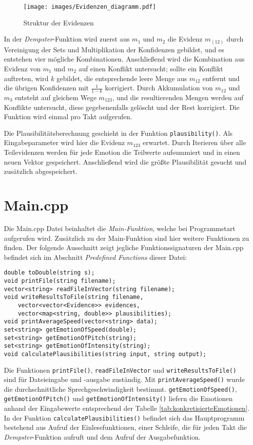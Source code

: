 \begin{figure}
\centering
\texttt{[image: images/Evidenzen\_diagramm.pdf]}
\caption{Struktur der Evidenzen}
\label{diagramm_evidenzen}
\end{figure}

In der \textit{Dempster}-Funktion wird zuerst aus \(m_1\) und \(m_2\) die Evidenz \(m_(12)\) durch Vereinigung der Sets und Multiplikation der Konfidenzen gebildet, und es entstehen vier mögliche Kombinationen. Anschließend wird die Kombination aus Evidenz von \(m_1\) und \(m_2\) auf einen Konflikt untersucht; sollte ein Konflikt auftreten, wird \(k\) gebildet, die entsprechende leere Menge aus \(m_{12}\) entfernt und die übrigen Konfidenzen mit \(\frac{1}{1-k}\) korrigiert. Durch Akkumulation von \(m_{12}\) und \(m_3\) entsteht auf gleichem Wege \(m_{123}\), und die resultierenden Mengen werden auf Konflikte untersucht, diese gegebenenfalls gelöscht und der Rest korrigiert. Die Funktion wird einmal pro Takt aufgerufen.
 
Die Plausibilitätsberechnung geschieht in der Funktion \verb|plausibility()|. Als Eingabeparameter wird hier die Evidenz \(m_{123}\) erwartet. Durch Iterieren über alle Teilevidenzen werden für jede Emotion die Teilwerte aufsummiert und in einen neuen Vektor gespeichert. Anschließend wird die größte Plausibilität gesucht und zusätzlich abgespeichert.
 
\section{Main.cpp}
Die Main.cpp Datei beinhaltet die \textit{Main-Funktion}, welche bei Programmstart aufgerufen wird.
Zusätzlich zu der Main-Funktion sind hier weitere Funktionen zu finden. Der folgende Ausschnitt zeigt jegliche Funktionssignaturen der Main.cpp befindet sich im Abschnitt \textit{Predefined Functions} dieser Datei: 

\begin{lstlisting}[caption=Predefined classes/functions aus der Main.cpp, label=Bsp.1]
double toDouble(string s);
void printFile(string filename);
vector<string> readFileInVector(string filename);
void writeResultsToFile(string filename, 
	vector<vector<Evidence>> evidences, 
	vector<map<string, double>> plausibilities);
void printAverageSpeed(vector<string> data);
set<string> getEmotionOfSpeed(double);
set<string> getEmotionOfPitch(string);
set<string> getEmotionOfIntensity(string);
void calculatePlausibilities(string input, string output);
\end{lstlisting}
Die Funktionen \verb|printFile()|, \verb|readFileInVector| und \verb|writeResultsToFile()| sind  für Dateieingabe und -ausgabe zuständig. Mit \verb|printAverageSpeed()| wurde die durchschnittliche Sprechgeschwindigkeit bestimmt. \verb|getEmotionOfSpeed()|, \verb|getEmotionOfPitch()| und \verb|getEmotionOfIntensity()| liefern die Emotionen anhand der Eingabewerte entsprechend der Tabelle \ref{tab:konkretisierteEmotionen}. In der Funktion \verb|calculatePlausibilities()| befindet sich das Hauptprogramm bestehend aus Aufruf der Einlesefunktionen, einer Schleife, die für jeden Takt die \textit{Dempster}-Funktion aufruft und dem Aufruf der Ausgabefunktion.

